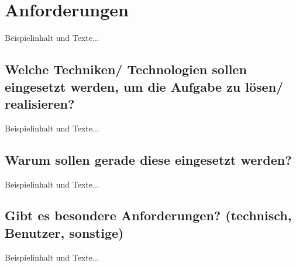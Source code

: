 
\section{Anforderungen}
Beispielinhalt und Texte...


\subsection{Welche Techniken/ Technologien sollen eingesetzt werden, um die Aufgabe zu lösen/ realisieren?}
Beispielinhalt und Texte...

\subsection{Warum sollen gerade diese eingesetzt werden?}
Beispielinhalt und Texte...



\subsection{Gibt es besondere Anforderungen? (technisch, Benutzer, sonstige)}
Beispielinhalt und Texte...

